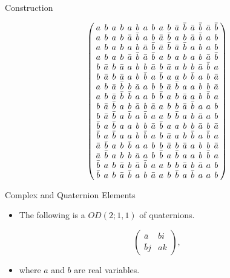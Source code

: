 \documentclass{beamer}
\begin{document}
\begin{frame}{Construction}

  \[
    \arraycolsep=2.0pt\def\arraystretch{0.75}
    \left(
      \begin{array}{cccccccccccccccc}
        a&b&a&b&a&b&a&b&a&b&\bar{a}&\bar{b}&\bar{a}&\bar{b}&\bar{a}&\bar{b}\\
        a&b&a&b&\bar{a}&\bar{b}&a&b&\bar{a}&\bar{b}&a&b&\bar{a}&\bar{b}&a&b\\
        a&b&a&b&a&b&\bar{a}&\bar{b}&\bar{a}&\bar{b}&\bar{a}&\bar{b}&a&b&a&b\\
        a&b&a&b&\bar{a}&\bar{b}&\bar{a}&\bar{b}&a&b&a&b&a&b&\bar{a}&\bar{b}\\
        b&\bar{a}&b&\bar{a}&a&b&b&\bar{a}&b&\bar{a}&a&b&b&\bar{a}&\bar{b}&a\\
        b&\bar{a}&b&\bar{a}&a&b&\bar{b}&a&\bar{b}&a&a&b&\bar{b}&a&b&\bar{a}\\
        a&b&\bar{a}&\bar{b}&b&\bar{a}&a&b&b&\bar{a}&\bar{b}&a&a&b&b&\bar{a}\\
        a&b&\bar{a}&\bar{b}&\bar{b}&a&a&b&\bar{b}&a&b&\bar{a}&a&b&\bar{b}&a\\
        b&\bar{a}&\bar{b}&a&b&\bar{a}&b&\bar{a}&a&b&b&\bar{a}&\bar{b}&a&a&b\\
        b&\bar{a}&\bar{b}&a&\bar{b}&a&\bar{b}&a&a&b&\bar{b}&a&b&\bar{a}&a&b\\
        \bar{b}&a&\bar{b}&a&a&b&b&\bar{a}&\bar{b}&a&a&b&b&\bar{a}&b&\bar{a}\\
        \bar{b}&a&\bar{b}&a&a&b&\bar{b}&a&b&\bar{a}&a&b&\bar{b}&a&\bar{b}&a\\
        \bar{a}&\bar{b}&a&b&\bar{b}&a&a&b&b&\bar{a}&b&\bar{a}&a&b&b&\bar{a}\\
        \bar{a}&\bar{b}&a&b&b&\bar{a}&a&b&\bar{b}&a&\bar{b}&a&a&b&\bar{b}&a\\
        \bar{b}&a&b&\bar{a}&b&\bar{a}&\bar{b}&a&a&b&b&\bar{a}&b&\bar{a}&a&b\\
        \bar{b}&a&b&\bar{a}&\bar{b}&a&b&\bar{a}&a&b&\bar{b}&a&\bar{b}&a&a&b\\
      \end{array}
    \right)
  \]
  
\end{frame}


\begin{frame}{Complex and Quaternion Elements}
  \begin{itemize}
    \item The following is a $OD(2;1,1)$ of quaternions.
  \end{itemize}

  \[
  \begin{pmatrix}
    \bar{a} & bi \\
    \bar{b}j & ak
  \end{pmatrix},
  \]

  \begin{itemize}
    \item where $a$ and $b$ are real variables.
  \end{itemize}
\end{frame}
\end{document}
